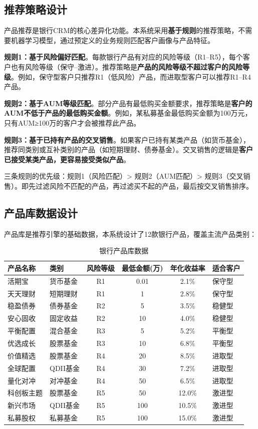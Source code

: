 \subsection{推荐策略设计}

产品推荐是银行CRM的核心差异化功能。本系统采用\textbf{基于规则}的推荐策略，不需要机器学习模型，通过预定义的业务规则匹配客户画像与产品特征。

\textbf{规则1：基于风险偏好匹配}。每款银行产品有对应的风险等级（R1--R5），每个客户也有风险等级（保守--激进）。推荐策略是\textbf{产品的风险等级不超过客户的风险等级}。例如，保守型客户只推荐R1（低风险）产品，而进取型客户可以推荐R1--R4产品。

\textbf{规则2：基于AUM等级匹配}。部分产品有最低购买金额要求，推荐策略是\textbf{客户的AUM不低于产品的最低购买金额}。例如，某私募基金最低购买金额为100万元，只有AUM≥100万的客户才会被推荐此产品。

\textbf{规则3：基于已持有产品的交叉销售}。如果客户已持有某类产品（如货币基金），推荐同类别或互补类别的产品（如短期理财、债券基金）。交叉销售的逻辑是\textbf{客户已接受某类产品，更容易接受类似产品}。

三条规则的优先级：规则1（风险匹配）> 规则2（AUM匹配）> 规则3（交叉销售）。即先过滤风险不匹配的产品，再过滤买不起的产品，最后按交叉销售排序。

\subsection{产品库数据设计}

产品库是推荐引擎的基础数据，本系统设计了12款银行产品，覆盖主流产品类别：

\begin{table}[H]
\centering
\small
\begin{tabular}{llcccl}
\toprule
\textbf{产品名称} & \textbf{类别} & \textbf{风险等级} & \textbf{最低金额(万)} & \textbf{年化收益率} & \textbf{适合客户} \\
\midrule
活期宝 & 货币基金 & R1 & 0.01 & 2.1\% & 保守型 \\
天天理财 & 短期理财 & R1 & 1 & 2.8\% & 保守型 \\
稳盈债券 & 债券基金 & R2 & 5 & 3.5\% & 稳健型 \\
安心固收 & 固定收益 & R2 & 10 & 4.0\% & 稳健型 \\
平衡配置 & 混合基金 & R3 & 5 & 5.2\% & 平衡型 \\
优选成长 & 股票基金 & R3 & 10 & 6.8\% & 平衡型 \\
价值精选 & 股票基金 & R4 & 20 & 8.5\% & 进取型 \\
全球配置 & QDII基金 & R4 & 30 & 7.2\% & 进取型 \\
量化对冲 & 对冲基金 & R4 & 50 & 6.5\% & 进取型 \\
科创板主题 & 股票基金 & R5 & 50 & 12.0\% & 激进型 \\
新兴市场 & QDII基金 & R5 & 100 & 10.5\% & 激进型 \\
私募股权 & 私募基金 & R5 & 100 & 15.0\% & 激进型 \\
\bottomrule
\end{tabular}
\caption{银行产品库数据}
\end{table}

